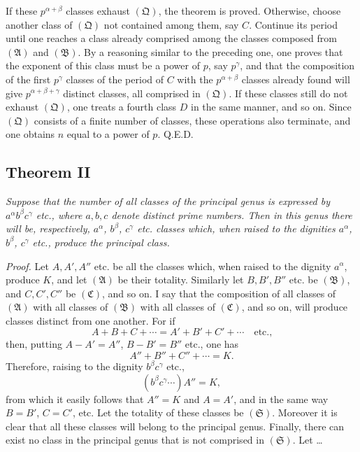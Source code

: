\documentclass[12pt]{article}
\begin{document}
If these $p^{\alpha+\beta}$ classes exhaust $(\mathfrak Q)$, the theorem is proved. Otherwise, choose another class of $(\mathfrak Q)$ not contained among them, say $C$. Continue its period until one reaches a class already comprised among the classes composed from $(\mathfrak A)$ and $(\mathfrak B)$. By a reasoning similar to the preceding one, one proves that the exponent of this class must be a power of $p$, say $p^\gamma$, and that the composition of the first $p^\gamma$ classes of the period of $C$ with the $p^{\alpha+\beta}$ classes already found will give $p^{\alpha+\beta+\gamma}$ distinct classes, all comprised in $(\mathfrak Q)$. If these classes still do not exhaust $(\mathfrak Q)$, one treats a fourth class $D$ in the same manner, and so on. Since $(\mathfrak Q)$ consists of a finite number of classes, these operations also terminate, and one obtains $n$ equal to a power of $p$. Q.E.D.

\subsection*{Theorem II}

\emph{Suppose that the number of all classes of the principal genus is expressed by $a^\alpha b^\beta c^\gamma$ etc., where $a,b,c$ denote distinct prime numbers. Then in this genus there will be, respectively, $a^\alpha$, $b^\beta$, $c^\gamma$ etc. classes which, when raised to the dignities $a^\alpha$, $b^\beta$, $c^\gamma$ etc., produce the principal class.}

\emph{Proof.} Let $A,A',A''$ etc. be all the classes which, when raised to the dignity $a^\alpha$, produce $K$, and let $(\mathfrak A)$ be their totality. Similarly let $B,B',B''$ etc. be $(\mathfrak B)$, and $C,C',C''$ be $(\mathfrak C)$, and so on. I say that the composition of all classes of $(\mathfrak A)$ with all classes of $(\mathfrak B)$ with all classes of $(\mathfrak C)$, and so on, will produce classes distinct from one another. For if
\[
A+B+C+\cdots=A'+B'+C'+\cdots \quad\text{etc.,}
\]
then, putting $A-A'=A''$, $B-B'=B''$ etc., one has
\[
A''+B''+C''+\cdots=K.
\]
Therefore, raising to the dignity $b^\beta c^\gamma$ etc.,
\[
(b^\beta c^\gamma\cdots)A''=K,
\]
from which it easily follows that $A''=K$ and $A=A'$, and in the same way $B=B'$, $C=C'$, etc. Let the totality of these classes be $(\mathfrak S)$. Moreover it is clear that all these classes will belong to the principal genus. Finally, there can exist no class in the principal genus that is not comprised in $(\mathfrak S)$. Let \ldots
\end{document}

